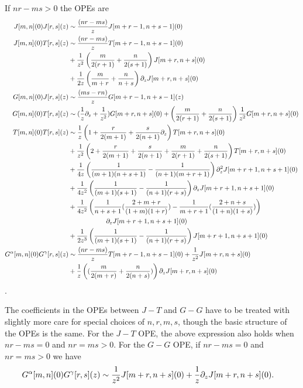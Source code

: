 \documentclass[../main.tex]{subfiles}
\begin{document}
If $nr-ms > 0$ the OPEs are
\begin{align}
J[m,n](0)J[r, s](z) &\sim {(nr-ms) \over z}J[m + r -1, n + s -1](0) \\
J[m, n](0)T[r, s](z) &\sim {(nr-ms) \over z}T[m + r -1, n + s -1](0) \\ \nonumber &+ {1 \over z^2}\left({m \over 2(r + 1)} + {n \over 2(s + 1)}\right)J[m + r, n + s](0) \\ \nonumber
&+{1 \over 2 z}\left({m \over m + r} + {n \over n + s} \right)\partial_z J[m + r, n + s](0)\\
G[m, n](0)J[r, s](z) &\sim {(ms - rn) \over z}G[m + r -1, n + s - 1](z) \\
G[m, n](0)T[r, s](z) &\sim ({1 \over z} \partial_z + {1 \over z^2})G[m + r, n+s](0) + \left({m \over 2(r+1)} + {n \over 2 (s + 1)}\right){1 \over z^2}G[m + r, n+s](0) \\
T[m, n](0)T[r, s](z) &\sim {1 \over z}\left(1 + {r \over 2(m+1)} + {s \over 2(n+1)}\partial_z \right) T[m + r, n +s](0) \\ \nonumber &+ {1 \over z^2}\left(2 + {r \over 2(m+1)} + {s \over 2(n+1)} + {m \over 2(r+1)} + {n \over 2(s+1)} \right)T[m + r, n + s](0)\\ \nonumber
&+{1 \over 4 z}\left({1 \over (m + 1)(n + s + 1)}- {1 \over (n +1)(m + r + 1)} \right) \partial^2_z J[m + r  +1, n + s +1](0) \\ \nonumber
&+{1 \over 4 z^2}\left({1 \over (m + 1)(s + 1)}- {1 \over (n+1)(r + s)}\right)\partial_z J[m + r + 1, n + s + 1](0) \\ \nonumber 
&+ {1 \over 4 z^2}\left({1 \over n + s + 1}({2 + m + r \over (1 + m)(1 + r)}) - {1 \over m + r + 1}({2 + n + s \over (1 + n)(1 + s)}) \right) \\ \nonumber & \ \ \ \ \ \ \ \ \ \ \ \ \ \ \ \ \ \partial_z J[m + r + 1, n + s + 1](0) \\ \nonumber
&+{1 \over 2 z^3}\left( {1 \over (m + 1)(s + 1)}- {1 \over (n+1)(r + s)}\right) J[m + r + 1, n + s + 1](0) \\ \nonumber
G^{\alpha}[m, n](0)G^{\gamma}[r, s](z) &\sim {(nr-ms) \over z}T[m + r -1, n + s -1](0) + {1 \over z^2}J[m + r, n + s](0) \\ \nonumber
&+{1 \over z}\left(({m \over 2 (m + r)} + {n \over 2 (n + s)})\right)\partial_z J[m + r, n+s](0)
\end{align}. 

The coefficients in the OPEs between $J-T$ and $G-G$ have to be treated with slightly more care for special choices of $n, r, m, s$, though the basic structure of the OPEs is the same.
For the $J-T$ OPE, the above expression also holds when $nr - ms = 0$ and $nr = m s >0$. 
For the $G-G$ OPE, if $n r - ms = 0$ and $nr = ms > 0$ we have
\begin{align}
G^{\alpha}[m, n](0)G^{\gamma}[r, s](z) &\sim {1 \over z^2}J[m + r, n + s](0) +{1 \over z}\partial_z J[m + r, n+s](0).
\end{align}
\end{document}
